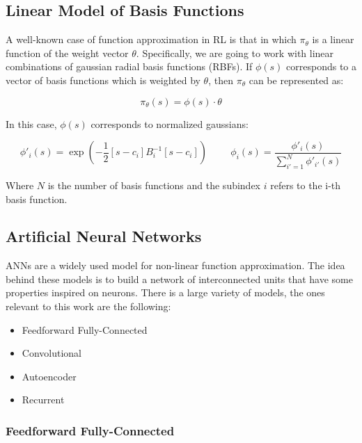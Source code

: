 \subsection{Linear Model of Basis Functions}
A well-known case of function approximation in RL is that in which $\pi_{\theta}$ is a linear function of
the weight vector $\theta$. Specifically, we are going to work with linear combinations of gaussian radial basis functions (RBFs). If $\phi(s)$ corresponds to a vector of basis functions which is weighted by $\theta$, then $\pi_{\theta}$ can be represented as:

\begin{equation}
    \pi_{\theta}(s) = \phi(s) \cdot \theta
    \label{eq:lcbf}
\end{equation}

In this case, $\phi(s)$ corresponds to normalized gaussians:

\begin{equation}
    \phi'_{i}(s) = \exp\left( -\frac{1}{2}[s - c_{i}]B^{-1}_{i}[s-c_{i}]\right) 
    \hspace{1cm}
    \phi_{i}(s) = \frac{\phi'_{i}(s)}{\sum_{i'=1}^{N}{\phi'_{i'}(s)}}
\end{equation}

Where $N$ is the number of basis functions and the subindex $i$ refers to the i-th basis function.

\subsection{Artificial Neural Networks}

ANNs are a widely used model for non-linear function approximation. The idea behind these models is to build a network of interconnected units that have some properties inspired on neurons. There is a large variety of models, the ones relevant to this work are the following:

\begin{itemize}
    \item Feedforward Fully-Connected
    \item Convolutional
    \item Autoencoder
    \item Recurrent
\end{itemize}

\subsubsection{Feedforward Fully-Connected}
    
